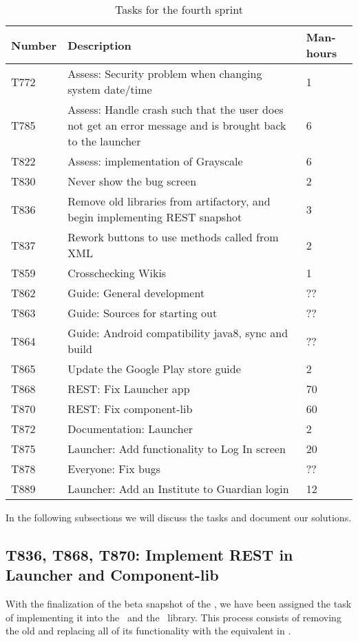 \begin{table}[H]
\begin{centering}
\begin{tabular}{|l|p{9cm}|l|}
\hline
Number 	& Description & Man-hours \\ \hline
T772    & Assess: Security problem when changing system date/time & 1\\\hline
T785	& Assess: Handle crash such that the user does not get an error message and
is brought back to the launcher & 6\\ \hline
T822    & Assess: implementation of Grayscale & 6\\\hline
T830    & Never show the bug screen & 2 \\\hline
T836	& Remove old libraries from artifactory, and begin implementing REST
snapshot & 3\\\hline
T837	& Rework buttons to use methods called from XML & 2\\\hline
T859   	& Crosschecking Wikis & 1\\\hline
T862  	& Guide: General development & ?? \\ \hline
T863	& Guide: Sources for starting out & ??\\ \hline
T864	& Guide: Android compatibility java8, sync and build & ??\\
\hline 
T865	& Update the Google Play store guide & 2\\\hline
T868    & REST: Fix Launcher app & 70 \\\hline
T870    & REST: Fix component-lib & 60\\\hline
T872 	& Documentation: Launcher & 2\\ \hline
T875 	& Launcher: Add functionality to Log In screen & 20\\\hline 
T878 	& Everyone: Fix bugs & ??\\ \hline
T889	& Launcher: Add an Institute to Guardian login & 12 \\\hline
\end{tabular}
\caption{Tasks for the fourth sprint}
\label{Tasks4}
\end{centering}
\end{table}

In the following subsections we will discuss the tasks and document our
solutions.

\subsection{T836, T868, T870: Implement REST in Launcher and
Component-lib}\label{T836_T868_T870} 
With the finalization of the beta snapshot of the \rlib, we have been assigned
the task of implementing it into the \lapp\ and the \clib\ library. This process
consists of removing the old  and replacing all of its
functionality with the equivalent in \rlib.\nl

